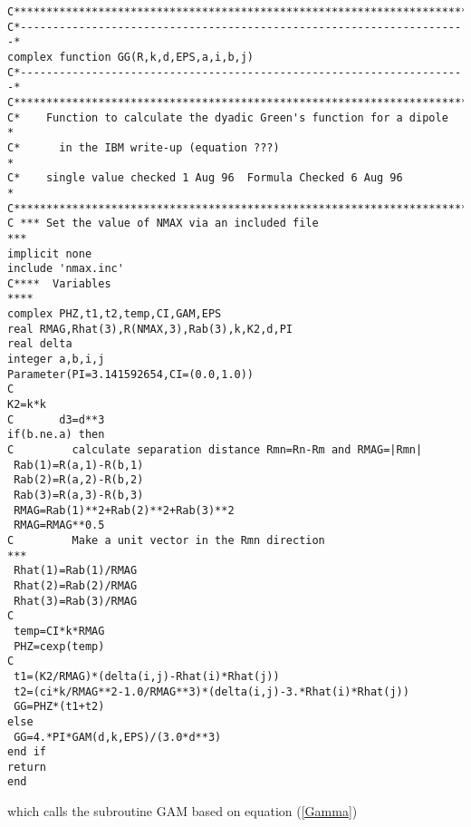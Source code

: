 \documentclass{article}
\begin{document}
\begin{verbatim}
C***********************************************************************
C*---------------------------------------------------------------------*
complex function GG(R,k,d,EPS,a,i,b,j)      
C*---------------------------------------------------------------------*      
C***********************************************************************
C*    Function to calculate the dyadic Green's function for a dipole   *
C*      in the IBM write-up (equation ???)                             *
C*    single value checked 1 Aug 96  Formula Checked 6 Aug 96          *
C***********************************************************************
C *** Set the value of NMAX via an included file                     ***  
implicit none
include 'nmax.inc'
C****  Variables                                                    ****
complex PHZ,t1,t2,temp,CI,GAM,EPS
real RMAG,Rhat(3),R(NMAX,3),Rab(3),k,K2,d,PI
real delta
integer a,b,i,j
Parameter(PI=3.141592654,CI=(0.0,1.0))
C
K2=k*k 
C       d3=d**3
if(b.ne.a) then
C         calculate separation distance Rmn=Rn-Rm and RMAG=|Rmn|
 Rab(1)=R(a,1)-R(b,1)
 Rab(2)=R(a,2)-R(b,2)
 Rab(3)=R(a,3)-R(b,3)
 RMAG=Rab(1)**2+Rab(2)**2+Rab(3)**2    
 RMAG=RMAG**0.5
C         Make a unit vector in the Rmn direction                    ***
 Rhat(1)=Rab(1)/RMAG 
 Rhat(2)=Rab(2)/RMAG
 Rhat(3)=Rab(3)/RMAG
C                          
 temp=CI*k*RMAG  
 PHZ=cexp(temp) 
C         
 t1=(K2/RMAG)*(delta(i,j)-Rhat(i)*Rhat(j)) 
 t2=(ci*k/RMAG**2-1.0/RMAG**3)*(delta(i,j)-3.*Rhat(i)*Rhat(j))
 GG=PHZ*(t1+t2)  
else
 GG=4.*PI*GAM(d,k,EPS)/(3.0*d**3)
end if        
return
end
\end{verbatim}%

which calls the subroutine GAM based on equation (\ref{Gamma})
\end{document}
